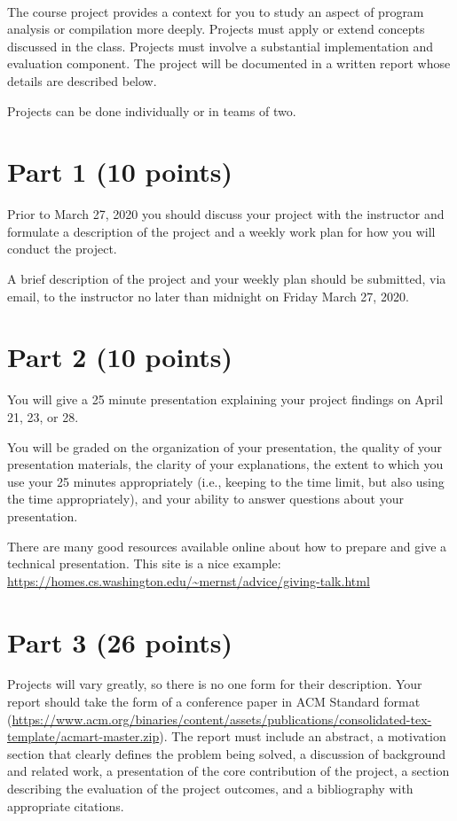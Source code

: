 \documentclass[12pt,letterpaper]{article}
\begin{document}
~

The course project provides a context for you to study
an aspect of program analysis or compilation more deeply.
Projects must apply or extend concepts discussed in the class.
Projects must involve a substantial implementation and evaluation
component.  The project will be documented in a written
report whose details are described below. 

Projects can be done individually or in teams of two.

\section*{Part 1 (10 points)}
Prior to March 27, 2020 you should discuss your
project with the instructor
and formulate a description of the project
and a weekly work plan for how you will conduct the project.

A brief description of the project and your weekly plan should
be submitted, via email, to the instructor no later than
midnight on Friday March 27, 2020.

\section*{Part 2 (10 points)}
You will give a 25 minute presentation explaining your project findings
on April 21, 23, or 28.  

You will be graded on the organization of your presentation,
the quality of your presentation materials,
the clarity of your explanations,
the extent to which you use your 25 minutes appropriately (i.e., keeping
to the time limit, but also using the time appropriately),
and your ability to answer questions about your presentation.

There are many good resources available online about how to prepare
and give a technical presentation.  This site is a nice example:
\url{https://homes.cs.washington.edu/~mernst/advice/giving-talk.html}

\section*{Part 3 (26 points)}
Projects will vary greatly, so there is no one form for their
description.  Your report should take the form of a 
conference paper in ACM Standard format (\url{https://www.acm.org/binaries/content/assets/publications/consolidated-tex-template/acmart-master.zip}). The report must include an abstract, a motivation 
section that clearly defines the problem being solved,
a discussion of background and related work, a presentation
of the core contribution of the project, a section describing
the evaluation of the project outcomes, and a bibliography
with appropriate citations.
\end{document}
